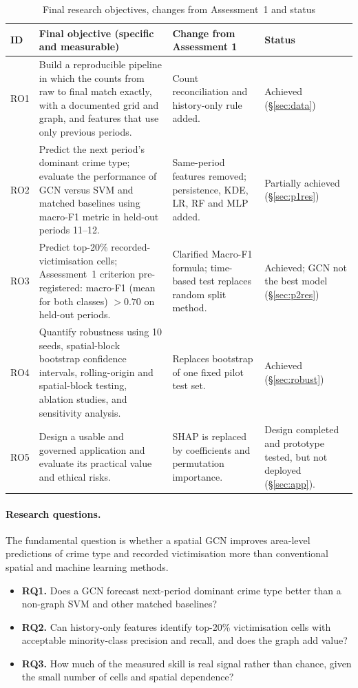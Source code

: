\documentclass[11pt,a4paper]{report}
\begin{document}
\begin{table}[H]
\centering\small
\caption{Final research objectives, changes from Assessment~1 and status}
\label{tab:ro}
\begin{tabularx}{\textwidth}{@{}l Y L{3.6cm} L{2.6cm}@{}}
\toprule
ID & Final objective (specific and measurable) & Change from Assessment 1 & Status\\
\midrule
RO1 & Build a reproducible pipeline in which the counts from raw to final match exactly, with a documented grid and graph, and features that use only previous periods. & Count reconciliation and history-only rule added. & Achieved (\S\ref{sec:data})\\
RO2 & Predict the next period's dominant crime type; evaluate the performance of GCN versus SVM and matched baselines using macro-F1 metric in held-out periods 11--12. & Same-period features removed; persistence, KDE, LR, RF and MLP added. & Partially achieved (\S\ref{sec:p1res})\\
RO3 & Predict top-20\% recorded-victimisation cells; Assessment~1 criterion pre-registered: macro-F1 (mean for both classes) $>0.70$ on held-out periods. & Clarified Macro-F1 formula; time-based test replaces random split method. & Achieved; GCN not the best model (\S\ref{sec:p2res})\\
RO4 & Quantify robustness using 10 seeds, spatial-block bootstrap confidence intervals, rolling-origin and spatial-block testing, ablation studies, and sensitivity analysis. & Replaces bootstrap of one fixed pilot test set. & Achieved (\S\ref{sec:robust})\\
RO5 & Design a usable and governed application and evaluate its practical value and ethical risks. & SHAP is replaced by coefficients and permutation importance. & Design completed and prototype tested, but not deployed (\S\ref{sec:app}).\\
\bottomrule
\end{tabularx}
\end{table}

\paragraph{Research questions.} The fundamental question is whether a spatial GCN improves area-level predictions of crime type and recorded victimisation more than conventional spatial and machine learning methods.
\begin{itemize}
\item \textbf{RQ1.} Does a GCN forecast next-period dominant crime type better than a non-graph SVM and other matched baselines?
\item \textbf{RQ2.} Can history-only features identify top-20\% victimisation cells with acceptable minority-class precision and recall, and does the graph add value?
\item \textbf{RQ3.} How much of the measured skill is real signal rather than chance, given the small number of cells and spatial dependence?
\end{itemize}
\end{document}

